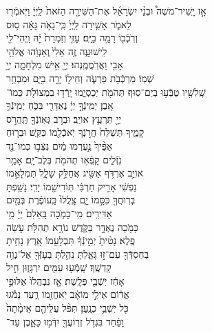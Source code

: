 \documentclass[twoside, openany, parskip=half, 11pt]{book}
\begin{document}
אָ֣ז \hfill
יָֽשִׁיר־מֹשֶׁה֩ \hfill וּבְנֵ֨י \hfill יִשְׂרָאֵ֜ל \hfill אֶת־הַשִּׁירָ֤ה \hfill הַזֹּאת֙ \hfill לַֽיְיָ֔ \hfill וַיֹּֽאמְֿר֖וּ \\
לֵאמֹ֑ר \hfill אָשִׁ֤ירָה לַּֽיְיָ֙ כִּֽי־גָאֹ֣ה גָּאָ֔ה \hfill ס֥וּס \\
וְרֹֽכְֿב֖וֹ רָמָ֥ה בַיָּֽם׃ \hfill עָזִּ֤י וְזִמְרָת֙ יָ֔הּ וַֽיְהִי־לִ֖י \\
לִֽישׁוּעָ֑ה \hfill זֶ֤ה אֵלִי֙ ֽוְאַנְוֵ֔הוּ \hfill אֱלֹהֵ֥י \\
 אָבִ֖י וַאֲרֹֽמֲמֶֽנְהוּ׃ \hfill יְיָ֖ אִ֣ישׁ מִלְחָמָ֑ה יְיָ֖ \\
שְׁמֽוֹ׃ \hfill מַרְכְּֿבֹ֥ת פַּרְעֹ֛ה וְחֵיל֖וֹ יָרָ֣ה בַיָּ֑ם \hfill וּמִבְחַ֥ר\\
שָֽׁלִשָׁ֖יו טֻבְֹּֿע֥וּ בְיַם־סֽוּף׃ \hfill תְּהֹמֹ֖ת יְכַסְיֻ֑מוּ יָֽרְֿד֥וּ בִמְצוֹלֹ֖ת כְּמוֹ־\\
אָֽבֶן׃ \hfill יְמִֽינְֿךָ֣ יְיָ֔ נֶאְדָּרִ֖י בַּכֹּ֑חַ \hfill יְמִֽינְֿךָ֥ \\
יְיָ֖ תִּרְעַ֥ץ אוֹיֵֽב׃ \hfill וּבְרֹ֥ב גְּאֽוֹנְֿךָ֖ תַּֽהֲרֹ֣ס \\
קָמֶ֑יךָ \hfill תְּשַׁלַּח֙ חֲרֹ֣נְֿךָ יֹֽאכְֿלֵ֖מוֹ כַּקַּֽשׁ׃ \hfill וּבְר֤וּחַ \\
אַפֶּ֨יךָ֙ נֶ֣עֶרְמוּ מַ֔יִם \hfill נִצְּֿב֥וּ כְמוֹ־נֵ֖ד \\
נֹֽזְֿלִ֑ים \hfill קָֽפְֿא֥וּ תְהֹמֹ֖ת בְּלֶב־יָֽם׃ \hfill אָמַ֥ר \\
אוֹיֵ֛ב אֶרְדֹּ֥ף אַשִּׂ֖יג \hfill אֲחַלֵּ֣ק שָׁלָ֑ל תִּמְלָאֵ֣מוֹ \\
נַפְשִׁ֔י \hfill אָרִ֣יק חַרְבִּ֔י תּֽוֹרִישֵׁ֖מוֹ יָדִֽי׃ \hfill נָשַׁ֥פְתָּ \\
בְרֽוּחֲךָ֖ כִּסָּ֣מוֹ יָ֑ם \hfill צָֽלֲלוּ֙ כַּֽעוֹפֶ֔רֶת בְּמַ֖יִם \\
אַדִּירִֽים׃ \hfill מִֽי־כָמֹ֤כָה בָּֽאֵלִם֙ יְיָ֔ \hfill מִ֥י \\
כָּמֹ֖כָה נֶאְדָּ֣ר בַּקֹּ֑דֶשׁ \hfill נוֹרָ֥א תְהִלֹּ֖ת עֹ֥שֵׂה \\
פֶֽלֶא׃ \hfill נָטִ֨יתָ֙ יְמִ֣ינְֿךָ֔ תִּבְלָעֵ֖מוֹ אָֽרֶץ׃ \hfill נָחִ֥יתָ \\
בְחַסְדְּֿךָ֖ עַם־ז֣וּ גָּאָ֑לְתָּ \hfill נֵהַ֥לְתָּ בְעָזְּֿךָ֖ אֶל־נְוֵ֥ה \\
קָדְשֶֽׁךָ׃ \hfill שָֽׁמְֿע֥וּ עַמִּ֖ים יִרְגָּז֑וּן \hfill חִ֣יל \\
אָחַ֔ז יֹֽשְֿׁבֵ֖י פְּלָֽשֶׁת׃ \hfill אָ֤ז נִבְהֲלוּ֙ אַלּוּפֵ֣י \\
אֱד֔וֹם \hfill אֵילֵ֣י מוֹאָ֔ב יֹֽאחֲזֵ֖מוֹ רָ֑עַד \hfill נָמֹ֕גוּ\\
כֹּ֖ל יֹֽשְֿׁבֵ֥י כְנָֽעַן׃ \hfill תִּפֹּ֨ל עֲלֵיהֶ֤ם אֵימָ֨תָה֙ \\
וָפַ֔חַד \hfill בִּגְדֹ֥ל זְרֽוֹעֲךָ֖ יִדְּֿמ֣וּ כָּאָ֑בֶן \hfill עַד־ \\
\end{document}
